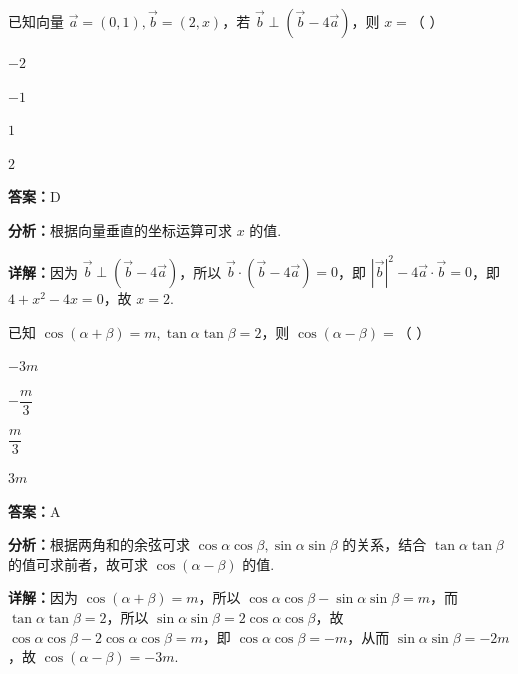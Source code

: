 \begin{question}[points=5]
已知向量 $\vec{a}=(0,1), \vec{b}=(2,x)$，若 $\vec{b}\perp(\vec{b}-4\vec{a})$，则 $x=$（ ）
\begin{choices}
  \item $-2$
  \item $-1$
  \item $1$
  \item $2$
\end{choices}
\begin{solution}
\textbf{答案：}D

\textbf{分析：}根据向量垂直的坐标运算可求 $x$ 的值.

\textbf{详解：}因为 $\vec{b}\perp(\vec{b}-4\vec{a})$，所以 $\vec{b}\cdot(\vec{b}-4\vec{a})=0$，即 $|\vec{b}|^2-4\vec{a}\cdot\vec{b}=0$，即 $4+x^2-4x=0$，故 $x=2$.
\end{solution}
\end{question}

\begin{question}[points=5]
已知 $\cos(\alpha+\beta)=m, \tan\alpha\tan\beta=2$，则 $\cos(\alpha-\beta)=$（ ）
\begin{choices}
  \item $-3m$
  \item $-\dfrac{m}{3}$
  \item $\dfrac{m}{3}$
  \item $3m$
\end{choices}
\begin{solution}
\textbf{答案：}A

\textbf{分析：}根据两角和的余弦可求 $\cos\alpha\cos\beta,\sin\alpha\sin\beta$ 的关系，结合 $\tan\alpha\tan\beta$ 的值可求前者，故可求 $\cos(\alpha-\beta)$ 的值.

\textbf{详解：}因为 $\cos(\alpha+\beta)=m$，所以 $\cos\alpha\cos\beta-\sin\alpha\sin\beta=m$，而 $\tan\alpha\tan\beta=2$，所以 $\sin\alpha\sin\beta=2\cos\alpha\cos\beta$，故 $\cos\alpha\cos\beta-2\cos\alpha\cos\beta=m$，即 $\cos\alpha\cos\beta=-m$，从而 $\sin\alpha\sin\beta=-2m$，故 $\cos(\alpha-\beta)=-3m$.
\end{solution}
\end{question}

